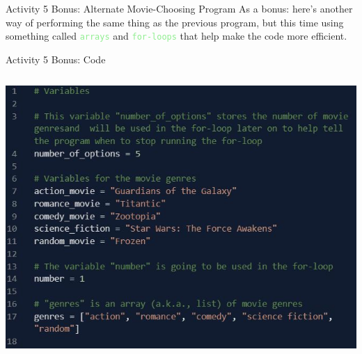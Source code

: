 \documentclass[hyperref={pdfpagemode=FullScreen},aspectratio=169]{beamer}
\begin{document}
  \begin{frame}{Activity 5 Bonus: Alternate Movie-Choosing Program}
    As a bonus: here's another way of performing the same thing as the previous program, but this time using something called \textcolor{lightGreen}{\texttt{arrays}} and \textcolor{lightGreen}{\texttt{for-loops}} that help make the code more efficient. 
  \end{frame}

  \begin{frame}{Activity 5 Bonus: Code}
    \begin{columns}[c]
      \begin{column}{0.45\textwidth}
        \begin{center}
          \includegraphics[scale=0.5]{./imgs/activityFiveAlternateCodePart1.jpg}
        \end{center}
      \end{column}

      \hfill 


\end{columns}
\end{frame}
\end{document}
